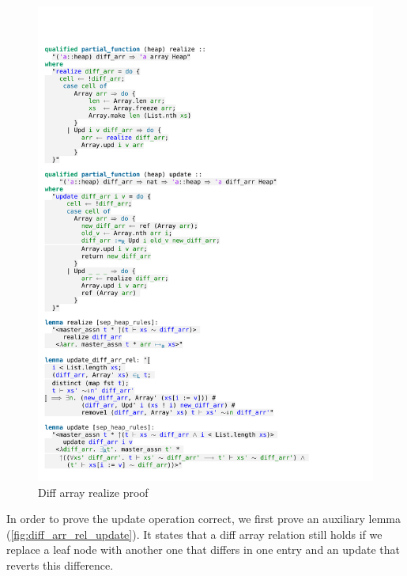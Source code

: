 \begin{figure}[htpb]
    \includegraphics[trim={0 8,2cm 0 19,6cm}, clip, width=1.00\textwidth]{figures/Theory_Diff_Arr_Update.pdf}
    \caption[Diff array realize proof]{Diff array realize proof}
    \label{fig:diff_arr_realize_proof}
\end{figure}

\noindent In order to prove the update operation correct, we first prove an auxiliary lemma (\autoref{fig:diff_arr_rel_update}). It states that a diff array relation still holds if we replace a leaf node with another one that differs in one entry and an update that reverts this difference.


